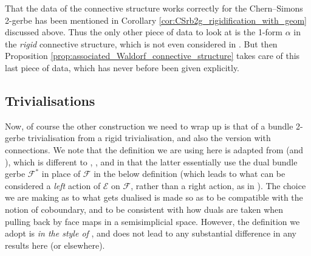 \documentclass[12pt]{amsart}
\theoremstyle{plain}
\theoremstyle{definition}
\theoremstyle{remark}
\numberwithin{equation}{section}
\newcommand{\cE}{{\mathcal E}}
\newcommand{\cF}{{\mathcal F}}
\newcommand{\<}{\langle}
\renewcommand{\>}{\rangle}
\begin{document}
That the data of the connective structure works correctly for the Chern--Simons 2-gerbe has been mentioned in Corollary \ref{cor:CSrb2g_rigidification_with_geom} discussed above. 
Thus the only other piece of data to look at is the 1-form $\alpha$ in the \emph{rigid} connective structure, which is not even considered in \cite{CJMSW}.
But then Proposition \ref{prop:associated_Waldorf_connective_structure} takes care of this last piece of data, which has never before been given explicitly.




\subsection{Trivialisations}

Now, of course the other construction we need to wrap up is that of a bundle 2-gerbe trivialisation from a rigid trivialisation, and also the version with connections. 
We note that the definition we are using here is adapted from \cite[Definition~12.2]{StevPhD} (and \cite[Definition~4.6]{CJMSW}), which is different to \cite[Definition~12.1]{StevPhD}, \cite[Definition~11.1]{Ste}, and \cite[Definition~3.5]{Wal} in that the latter essentially use the dual bundle gerbe $\cF^*$ in place of $\cF$ in the below definition (which leads to what can be considered a \emph{left} action of $\cE$ on $\cF$, rather than a right action, as in \cite[Definition~12.1]{StevPhD}). 
The choice we are making as to what gets dualised is made so as to be compatible with the notion of coboundary, and to be consistent with how duals are taken when pulling back by face maps in a semisimplicial space.
However, the definition we adopt is \emph{in the style of} \cite[Definition~3.5]{Wal}, and does not lead to any substantial difference in any results here (or elsewhere).
\end{document}
